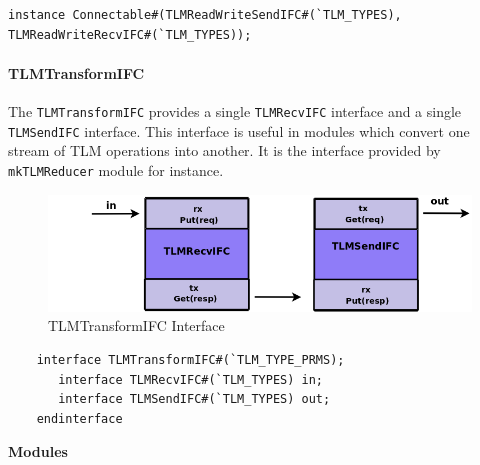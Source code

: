 \documentclass[twoside,letterpaper]{article}
\newcommand{\te}[1]{\texttt{#1}}
\begin{document}
\begin{verbatim}
instance Connectable#(TLMReadWriteSendIFC#(`TLM_TYPES), TLMReadWriteRecvIFC#(`TLM_TYPES));
\end{verbatim}



\paragraph{TLMTransformIFC}

The \te{TLMTransformIFC} provides a single \te{TLMRecvIFC} interface
and a single \te{TLMSendIFC} interface. This interface is useful in
modules which convert one stream of TLM operations into another. It is 
the interface provided by \te{mkTLMReducer} module for instance.

\begin{figure}[ht]
\begin{center}
\includegraphics[height = 1.2 in]{TLMTransformIFC}
\caption{TLMTransformIFC Interface}
\label{TLMtransform}
\end{center}
\end{figure}


\begin{verbatim}
    interface TLMTransformIFC#(`TLM_TYPE_PRMS);
       interface TLMRecvIFC#(`TLM_TYPES) in;
       interface TLMSendIFC#(`TLM_TYPES) out;
    endinterface
\end{verbatim}

{\bf Modules}
 
\label{sec-TLM-modules}
\end{document}
